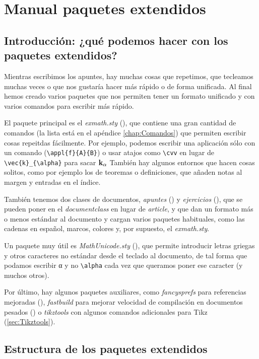 \chapter{Manual paquetes extendidos}
\label{chap:PaqueteExtendido}

\section{Introducción: ¿qué podemos hacer con los paquetes extendidos?}

Mientras escribimos los apuntes, hay muchas cosas que repetimos, que tecleamos muchas veces o que nos gustaría hacer más rápido o de forma unificada. Al final hemos creado varios paquetes que nos permiten tener un formato unificado y con varios comandos para escribir más rápido.

El paquete principal es el \textit{exmath.sty} (), que contiene una gran cantidad de comandos (la lista está en el apéndice \ref{chap:Comandos}) que permiten escribir cosas repeitdas fácilmente. Por ejemplo, podemos escribir una aplicación sólo con un comando (\verb|\appl{f}{A}{B}|) o usar atajos como \verb|\cvv| en lugar de \verb|\vec{k}_{\alpha}| para sacar $\mathbf{k}_{\alpha}$ También hay algunos entornos que hacen cosas solitos, como por ejemplo los de teoremas o definiciones, que añaden notas al margen y entradas en el índice.

También tenemos dos clases de documentos, \textit{apuntes} () y \textit{ejercicios} (), que se pueden poner en el \textit{documentclass} en lugar de \textit{article}, y que dan un formato más o menos estándar al documento y cargan varios paquetes habituales, como las cadenas en español, marcos, colores y, por supuesto, el \textit{exmath.sty}.

Un paquete muy útil es \textit{MathUnicode.sty} (), que permite introducir letras griegas y otros caracteres no estándar desde el teclado al documento, de tal forma que podamos escribir α y no \verb|\alpha| cada vez que queramos poner ese caracter (y muchos otros).

Por último, hay algunos paquetes auxiliares, como \textit{fancysprefs} para referencias mejoradas (), \textit{fastbuild} para mejorar velocidad de compilación en documentos pesados () o \textit{tikztools} con algunos comandos adicionales para Tikz (\ref{sec:Tikztools}).

\section{Estructura de los paquetes extendidos}

